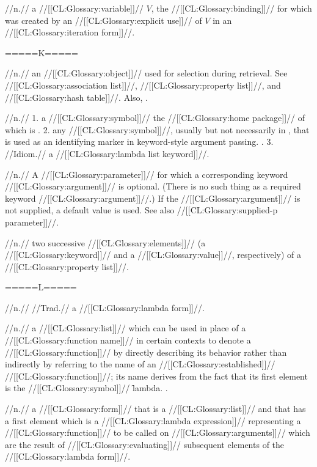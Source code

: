 
 //n.// a //[[CL:Glossary:variable]]// $V$, the //[[CL:Glossary:binding]]// for which was created by an //[[CL:Glossary:explicit use]]// of $V$ in an //[[CL:Glossary:iteration form]]//.

=====K=====

 //n.// an //[[CL:Glossary:object]]// used for selection during retrieval. See //[[CL:Glossary:association list]]//, //[[CL:Glossary:property list]]//, and //[[CL:Glossary:hash table]]//. Also, \seesection\SequenceConcepts.
 
 //n.// 1. a //[[CL:Glossary:symbol]]// the //[[CL:Glossary:home package]]// of which is . 2. any //[[CL:Glossary:symbol]]//, usually but not necessarily in , that is used as an identifying marker in keyword-style argument passing. . 3. //Idiom.// a //[[CL:Glossary:lambda list keyword]]//.

 //n.// A //[[CL:Glossary:parameter]]// for which a corresponding keyword //[[CL:Glossary:argument]]// is optional. (There is no such thing as a required keyword //[[CL:Glossary:argument]]//.) If the //[[CL:Glossary:argument]]// is not supplied, a default value is used. See also //[[CL:Glossary:supplied-p parameter]]//.

 //n.// two successive //[[CL:Glossary:elements]]// (a //[[CL:Glossary:keyword]]// and a //[[CL:Glossary:value]]//, respectively) of a //[[CL:Glossary:property list]]//.
 
=====L=====
 
 //n.// //Trad.// a //[[CL:Glossary:lambda form]]//.

 //n.// a //[[CL:Glossary:list]]// which can be used in place of a //[[CL:Glossary:function name]]// in certain contexts to denote a //[[CL:Glossary:function]]// by directly describing its behavior rather than indirectly by referring to the name of an //[[CL:Glossary:established]]// //[[CL:Glossary:function]]//; its name derives from the fact that its first element is the //[[CL:Glossary:symbol]]// \f{lambda}. .
 
 //n.// a //[[CL:Glossary:form]]// that is a //[[CL:Glossary:list]]// and that has a first element which is a //[[CL:Glossary:lambda expression]]// representing a //[[CL:Glossary:function]]// to be called on //[[CL:Glossary:arguments]]// which are the result of //[[CL:Glossary:evaluating]]// subsequent elements of the //[[CL:Glossary:lambda form]]//.

